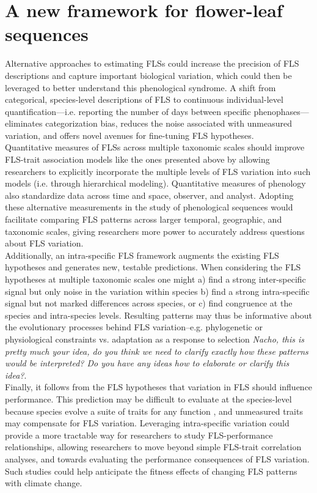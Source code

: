 \documentclass[12pt]{article}
\begin{document}
\section*{A new framework for flower-leaf sequences} 

\noindent Alternative approaches to estimating FLSs could increase the precision of FLS descriptions and capture important biological variation, which could then be leveraged to better understand this phenological syndrome. A shift from categorical, species-level descriptions of FLS to continuous individual-level quantification---i.e. reporting the number of days between specific phenophases---eliminates categorization bias, reduces the noise associated with unmeasured variation, and offers novel avenues for fine-tuning FLS hypotheses.\\ 

\noindent  Quantitative measures of FLSs across multiple taxonomic scales should improve FLS-trait association models like the ones presented above by allowing researchers to explicitly incorporate the multiple levels of FLS variation into such models (i.e. through hierarchical modeling). Quantitative measures of phenology \citep[e.g. the BBCH scale,][]{Finn2007} also standardize data across time and space, observer, and analyst. Adopting these alternative measurements in the study of phenological sequences would facilitate comparing FLS patterns across larger temporal, geographic, and taxonomic scales, giving researchers more power to accurately address questions about FLS variation.\\

\noindent Additionally, an intra-specific FLS framework augments the existing FLS hypotheses and generates new, testable predictions. When considering the FLS hypotheses at multiple taxonomic scales one might a) find a strong inter-specific signal but only noise in the variation within species b) find a strong intra-specific signal but not marked differences across species, or c) find congruence at the species and intra-species levels. Resulting patterns may thus be informative about the evolutionary processes behind FLS variation--e.g. phylogenetic or physiological constraints  vs. adaptation as a response to selection \emph{Nacho, this is pretty much your idea, do you think we need to clarify exactly how these patterns would be interpreted? Do you have any ideas how to elaborate or clarify this idea?}.\\

\noindent Finally, it follows from the FLS hypotheses that variation in FLS should influence performance. This prediction may be difficult to evaluate at the species-level because species evolve a suite of traits for any function \citep{Davies2019}, and unmeasured traits may compensate for FLS variation. Leveraging intra-specific variation could provide a more tractable way for researchers to study FLS-performance relationships, allowing researchers to move beyond simple FLS-trait correlation analyses, and towards evaluating the performance consequences of FLS variation. Such studies could help anticipate the fitness effects of changing FLS patterns with climate change.\\
\end{document}
